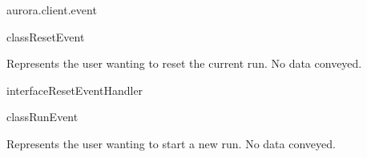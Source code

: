 \begin{texdocpackage}{aurora.client.event}
\begin{texdocclass}{class}{ResetEvent}
\label{texdoclet:aurora.client.event.ResetEvent}
\begin{texdocclassintro}
Represents the user wanting to reset the current run.
 No data conveyed.\end{texdocclassintro}
\begin{texdocclassfields}
\end{texdocclassfields}
\begin{texdocclassconstructors}
\end{texdocclassconstructors}
\begin{texdocclassmethods}
\end{texdocclassmethods}
\end{texdocclass}


\begin{texdocclass}{interface}{ResetEventHandler}
\label{texdoclet:aurora.client.event.ResetEventHandler}
\begin{texdocclassintro}
\end{texdocclassintro}
\begin{texdocclassmethods}
\end{texdocclassmethods}
\end{texdocclass}


\begin{texdocclass}{class}{RunEvent}
\label{texdoclet:aurora.client.event.RunEvent}
\begin{texdocclassintro}
Represents the user wanting to start a new run.
 No data conveyed.\end{texdocclassintro}
\begin{texdocclassfields}
\end{texdocclassfields}
\begin{texdocclassconstructors}
\end{texdocclassconstructors}
\begin{texdocclassmethods}
\end{texdocclassmethods}
\end{texdocclass}



\end{texdocpackage}
